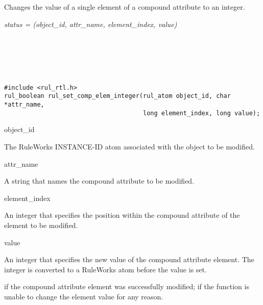 \section*{}

Changes the value of a single element of a compound attribute to an
integer.

\Syntax

\it{status} = (\it{object\_id},
\it{attr\_name}, \it{element\_index}, \it{value})

\begin{args}
   \\
   \\
   \\
   \\
\end{args}


\CBinding
\begin{verbatim}
#include <rul_rtl.h>
rul_boolean rul_set_comp_elem_integer(rul_atom object_id, char *attr_name,
                                      long element_index, long value);
\end{verbatim}

\begin{arguments}
\item[object\_id]

  The RuleWorks INSTANCE-ID atom associated with the object to be
  modified.

\item[attr\_name]

  A string that names the compound attribute to be modified.

\item[element\_index]

  An integer that specifies the position within the compound attribute
  of the element to be modified.

\item[value]

  An integer that specifies the new value of the compound attribute
  element. The integer is converted to a RuleWorks  atom
  before the value is set.
\end{arguments}

\ReturnValue

 if the compound attribute element was successfully modified;
 if the function is unable to change the element value for
any reason.

